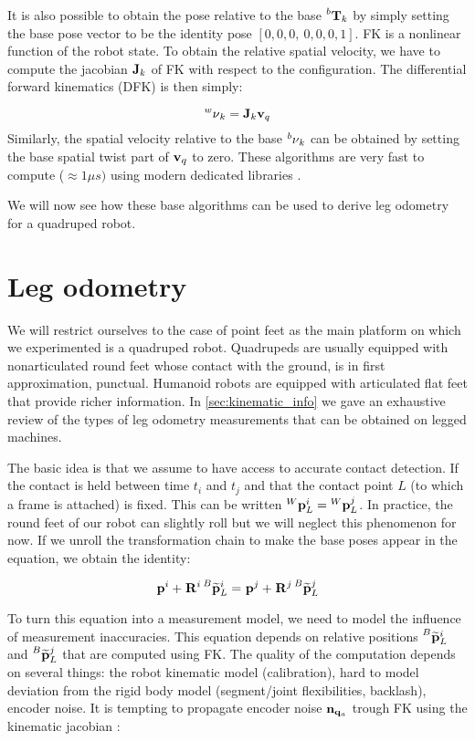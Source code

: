 It is also possible to obtain the pose relative to the base $\prescript{b}{}{{\bf T}}_{k}$ by simply setting the base pose vector to be the identity pose $[0,0,0,~0,0,0,1]$.
FK is a nonlinear function of the robot state. To obtain the relative spatial velocity, we have to compute the jacobian ${\bf J}_k$ of FK with respect to the configuration.
The differential forward kinematics (DFK) is then simply:

\begin{equation}
    \prescript{w}{}{\mathbf{\nu}}_k = {\bf J}_k {\bf v}_q    
\end{equation}
Similarly, the spatial velocity relative to the base $\prescript{b}{}{\mathbf{\nu}}_k$ can be obtained by setting the base spatial twist part of ${\bf v}_q$ to zero.
These algorithms are very fast to compute ($\approx 1\mu s)$ using modern dedicated libraries \cite{carpentier2019pinocchio}.

We will now see how these base algorithms can be used to derive leg odometry for a quadruped robot.

\section{Leg odometry}
We will restrict ourselves to the case of point feet as the main platform on which we experimented is a quadruped robot.
Quadrupeds are usually equipped with nonarticulated round feet whose contact with the ground, is in first approximation, punctual.
Humanoid robots are equipped with articulated flat feet that provide richer information. In \ref{sec:kinematic_info} we gave an exhaustive review of the types of leg 
odometry measurements that can be obtained on legged machines.

The basic idea is that we assume to have access to accurate contact detection. If the contact is held between time $t_i$ and $t_j$ and that
the contact point $L$ (to which a frame is attached) is fixed. This can be written $\prescript{W}{}{{\bf p}}_{L}^i = \prescript{W}{}{{\bf p}}_{L}^j$. 
In practice, the round feet of our robot can slightly roll but we will neglect this phenomenon for now. 
If we unroll the transformation chain to make the base poses appear in the equation, we obtain the identity:

\begin{equation}
    \prescript{}{}{{\bf p}}_{}^i + \prescript{}{}{{\bf R}}_{}^i \prescript{B}{}{\widetilde{{\bf p}}}_{L}^i = \prescript{}{}{{\bf p}}_{}^j + \prescript{}{}{{\bf R}}_{}^j \prescript{B}{}{\widetilde{{\bf p}}}_{L}^j
\end{equation}

To turn this equation into a measurement model, we need to model the influence of measurement inaccuracies.
This equation depends on relative positions $\prescript{B}{}{\widetilde{{\bf p}}}_{L}^i$ and $\prescript{B}{}{\widetilde{{\bf p}}}_{L}^j$ that are computed using FK. The quality of the computation depends on several things:
the robot kinematic model (calibration), hard to model deviation from the rigid body model (\eg segment/joint flexibilities, backlash), encoder noise.
It is tempting to propagate encoder noise ${\bf n}_{{\bf q}_a}$ trough FK using the kinematic jacobian \cite{bloesch2013state, hartley2018legged}:

